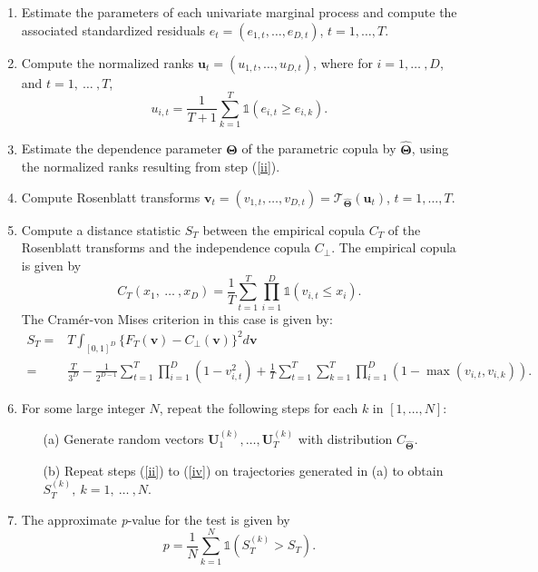 \begin{enumerate}
\item \label{i} Estimate the parameters of each univariate marginal process and compute the associated standardized residuals $e_t=(e_{1,t},\ldots, e_{D,t})$, $t=1,\ldots,T$.
\item \label{ii} Compute the normalized ranks $\mathbf{u}_t = (u_{1,t}, \ldots, u_{D,t})$, where for $i=1, \ldots \ , D$, and $ t=1, \ \ldots \ , T$,
$$
u_{i,t}=\frac{1}{T+1} \sum_{k=1}^T \mathds{1}(e_{i,t}\geq e_{i,k}).
$$
\item \label{iii} Estimate the dependence parameter $\mathbf{\Theta}$ of the parametric copula by $\hat{\mathbf{\Theta}}$, using the normalized ranks resulting from step (\ref{ii}).
\item \label{iv} Compute Rosenblatt transforms $\mathbf{v}_t= (v_{1,t},\ldots,v_{D,t}) = \mathcal{T}_{\hat{\mathbf{\Theta}}}(\mathbf{u}_t)$,
$t=1,\ldots,T$.
\item \label{v} Compute a distance statistic $S_T$ between the empirical copula $C_T$
of the Rosenblatt transforms and the independence copula $C_{\perp}$.
The empirical copula is given by
\begin{displaymath}
C_T(x_1, \ \ldots \ , x_D)=\frac{1}{T} \sum_{t=1}^T \prod_{i=1}^D
\mathds{1}(v_{i,t} \leq x_{i}).
\end{displaymath}
The Cram\'er-von Mises criterion in this case is given by:
\begin{align*}
S_T = {} & T \int_{[0,1]^D} \{F_T(\mathbf{v})-C_\perp(\mathbf{v}) \}^2 d\mathbf{v}\\
= {} & \frac{T}{3^D}-\frac{1}{2^{D-1}}\sum_{t=1}^{T} \prod_{i=1}^D
\left( 1-v_{i,t}^2\right)+\frac{1}{T} \sum_{t=1}^T \sum_{k=1}^T
\prod_{i=1}^D (1-\max(v_{i,t},v_{i,k})).
\end{align*}
\item For some large integer $N$, repeat the following steps for each $k$ in $[1,\ldots,N]$:
\begin{enumerate}
\item[(a)] \label{a} Generate random vectors $\mathbf{U}_1^{(k)},\ldots, \mathbf{U}_T^{(k)}$ with distribution $C_{\hat{\mathbf{\Theta}}}$.
\item[(b)] Repeat steps (\ref{ii}) to (\ref{iv}) on
trajectories generated in (a) to obtain $S_T^{(k)}, \ k=1, \ \ldots
\ , N$.
\end{enumerate}
\item The approximate \emph{p}-value for the test is given by
\begin{displaymath}
p=\frac{1}{N} \sum_{k=1}^N \mathds{1}\left(S_T^{(k)}>S_T\right).
\end{displaymath}
\end{enumerate}

